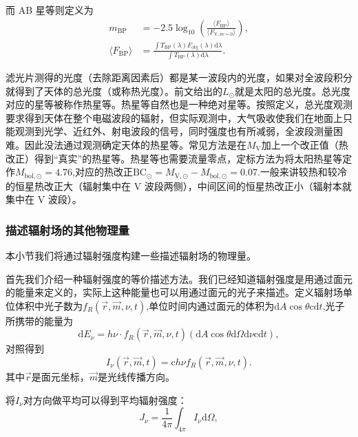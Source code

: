 \documentclass[../天体物理基础.tex]{subfiles}
\begin{document}
而 AB 星等则定义为
\begin{align}
m_{\text{BP}}&=-2.5\log_{10}(\frac{\langle F_{\text{BP}}\rangle}{\langle F_{\text{V},m=0}\rangle}),\\
\langle F_{\text{BP}}\rangle&=\frac{\int T_{\text{BP}}(\lambda)F_{\text{obj}}(\lambda)\mathrm{d}\lambda}{\int T_{\text{BP}}(\lambda)\mathrm{d}\lambda}.
\end{align}

滤光片测得的光度（去除距离因素后）都是某一波段内的光度，如果对全波段积分就得到了天体的总光度（或称热光度）。前文给出的$L_{\odot}$就是太阳的总光度。总光度对应的星等被称作热星等。热星等自然也是一种绝对星等。按照定义，总光度观测要求得到天体在整个电磁波段的辐射，但实际观测中，大气吸收使我们在地面上只能观测到光学、近红外、射电波段的信号，同时强度也有所减弱，全波段测量困难。因此没法通过观测确定天体的热星等。常见方法是在$M_{\text{V}}$加上一个改正值（热改正）得到“真实”的热星等。热星等也需要流量零点，定标方法为将太阳热星等定作$M_{\text{bol},\odot}=4.76$,对应的热改正$\text{BC}_{\odot}=M_{\text{V},\odot}-M_{\text{bol},\odot}=0.07$.一般来讲较热和较冷的恒星热改正大（辐射集中在 V 波段两侧），中间区间的恒星热改正小（辐射本就集中在 V 波段）。

\subsubsection{描述辐射场的其他物理量}
本小节我们将通过辐射强度构建一些描述辐射场的物理量。

首先我们介绍一种辐射强度的等价描述方法。我们已经知道辐射强度是用通过面元的能量来定义的，实际上这种能量也可以用通过面元的光子来描述。定义辐射场单位体积中光子数为$f_{R}\left(\vec{r},\vec{m},\nu,t\right)$,单位时间内通过面元的体积为$\mathrm{d}A\cos\theta\mathrm{c}\mathrm{d}t$,光子所携带的能量为
\begin{equation}
\mathrm{d}E_{\nu}=h\nu\cdot f_{R}\left(\vec{r},\vec{m},\nu,t\right)\left(\mathrm{d}A\cos\theta\mathrm{d}\Omega\mathrm{d}\nu\mathrm{c}\mathrm{d}t\right),
\end{equation}
对照得到
\begin{equation}
I_{\nu}\left(\vec{r},\vec{m},t\right)=\mathrm{c}h\nu f_{R}\left(\vec{r},\vec{m},\nu,t\right).
\end{equation}
其中$\vec{r}$是面元坐标，$\vec{m}$是光线传播方向。

将$I_{\nu}$对方向做平均可以得到平均辐射强度：
\begin{equation}
J_{\nu}=\frac1{4\pi}\int_{4\pi}I_{\nu}\mathrm{d}\Omega,
\end{equation}
\end{document}
